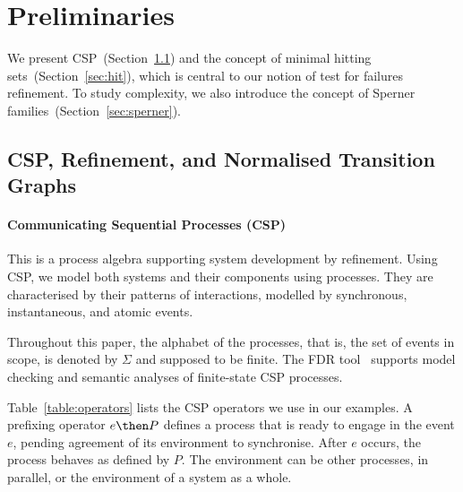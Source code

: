 \documentclass[3p,times]{elsarticle}
\begin{document}

\section{Preliminaries}
\label{section:preliminaries}

We present CSP~(Section~\ref{section:csp}) and the concept of minimal hitting
sets~(Section~\ref{sec:hit}), which is central to our notion of test
for failures refinement. To study complexity, we also introduce the concept
of Sperner families~(Section~\ref{sec:sperner}).

\subsection{CSP, Refinement, and Normalised Transition Graphs}
\label{section:csp}

\paragraph{Communicating Sequential Processes (CSP)} This is a process algebra supporting
system development by refinement. Using CSP, we model both systems and their
components using processes. They are characterised by their patterns of
interactions, modelled by synchronous, instantaneous, and atomic events.

Throughout this paper, the alphabet of the processes, that is, the set of
events in scope, is denoted by $\Sigma$ and supposed to be finite.
The FDR tool~\cite{fdr} supports model checking and semantic analyses of
finite-state CSP processes.

Table~\ref{table:operators} lists the CSP operators we use in our examples. A
prefixing operator $e \then P$ defines a process that is ready to engage in
the event $e$, pending agreement of its environment to synchronise. After $e$
occurs, the process behaves as defined by $P$. The environment can be other
processes, in parallel, or the environment of a system as a whole.
\end{document}
